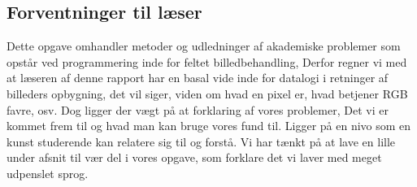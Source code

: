 \subsection{Forventninger til læser}
Dette opgave omhandler metoder og udledninger af akademiske problemer som opstår ved programmering inde for feltet billedbehandling, Derfor regner vi med at læseren af denne rapport har en basal vide inde for datalogi i retninger af billeders opbygning, det vil siger, viden om hvad en pixel er, hvad betjener RGB favre, osv. Dog ligger der vægt på at forklaring af vores problemer, Det vi er kommet frem til og hvad man kan bruge vores fund til. Ligger på en nivo som en kunst studerende kan relatere sig til og forstå.
Vi har tænkt på at lave en lille under afsnit til vær del i vores opgave, som forklare det vi laver med meget udpenslet sprog.
